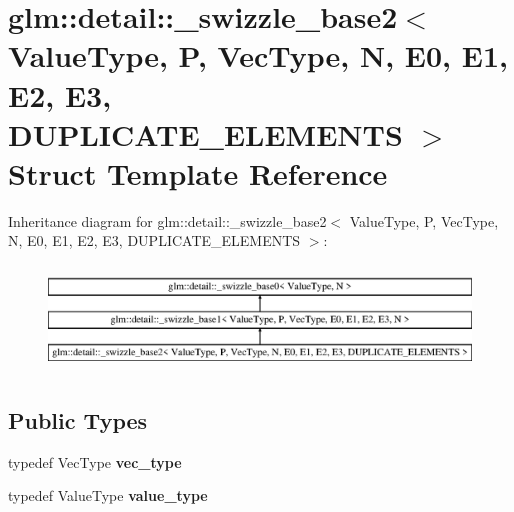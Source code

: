 \hypertarget{structglm_1_1detail_1_1__swizzle__base2}{}\section{glm\+:\+:detail\+:\+:\+\_\+swizzle\+\_\+base2$<$ Value\+Type, P, Vec\+Type, N, E0, E1, E2, E3, D\+U\+P\+L\+I\+C\+A\+T\+E\+\_\+\+E\+L\+E\+M\+E\+N\+TS $>$ Struct Template Reference}
\label{structglm_1_1detail_1_1__swizzle__base2}
Inheritance diagram for glm\+:\+:detail\+:\+:\+\_\+swizzle\+\_\+base2$<$ Value\+Type, P, Vec\+Type, N, E0, E1, E2, E3, D\+U\+P\+L\+I\+C\+A\+T\+E\+\_\+\+E\+L\+E\+M\+E\+N\+TS $>$\+:\begin{figure}[H]
\begin{center}
\leavevmode
\includegraphics[height=2.823529cm]{structglm_1_1detail_1_1__swizzle__base2}
\end{center}
\end{figure}
\subsection*{Public Types}
\begin{DoxyCompactItemize}
\item 
typedef Vec\+Type {\bfseries vec\+\_\+type}\hypertarget{structglm_1_1detail_1_1__swizzle__base2_a5f999904e676a4f5b0bdaa157415ee1c}{}\label{structglm_1_1detail_1_1__swizzle__base2_a5f999904e676a4f5b0bdaa157415ee1c}

\item 
typedef Value\+Type {\bfseries value\+\_\+type}\hypertarget{structglm_1_1detail_1_1__swizzle__base2_a656c11aaeeaca042deed88711c9dc063}{}\label{structglm_1_1detail_1_1__swizzle__base2_a656c11aaeeaca042deed88711c9dc063}

\end{DoxyCompactItemize}

